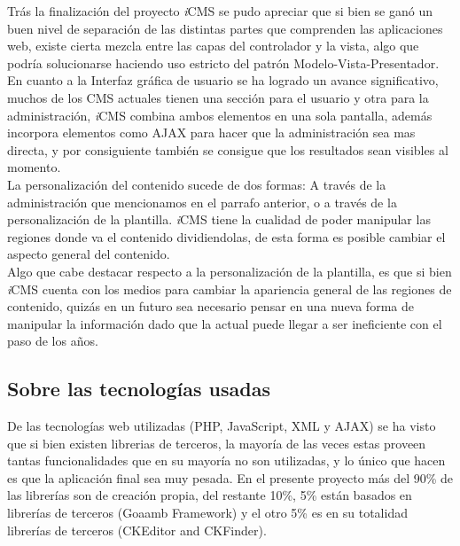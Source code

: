 Tr\'as la finalizaci\'on del proyecto \textit{i}CMS se pudo apreciar que si bien se gan\'o un buen nivel de separaci\'on de las distintas partes que comprenden las aplicaciones web, existe cierta mezcla entre las capas del controlador y la vista, algo que podr\'ia solucionarse haciendo uso estricto del patr\'on Modelo-Vista-Presentador.\\

En cuanto a la Interfaz gr\'afica de usuario se ha logrado un avance significativo, muchos de los CMS actuales tienen una secci\'on para el usuario y otra para la administraci\'on, \textit{i}CMS combina ambos elementos en una sola pantalla, adem\'as incorpora elementos como AJAX para hacer que la administraci\'on sea mas directa, y por consiguiente tambi\'en se consigue que los resultados sean visibles al momento.\\

La personalizaci\'on del contenido sucede de dos formas: A trav\'es de la administraci\'on que mencionamos en el parrafo anterior, o a trav\'es de la personalizaci\'on de la plantilla. \textit{i}CMS tiene la cualidad de poder manipular las regiones donde va el contenido dividiendolas, de esta forma es posible cambiar el aspecto general del contenido.\\

Algo que cabe destacar respecto a la personalizaci\'on de la plantilla, es que si bien \textit{i}CMS cuenta con los medios para cambiar la apariencia general de las regiones de contenido, quiz\'as en un futuro sea necesario pensar en una nueva forma de manipular la informaci\'on dado que la actual puede llegar a ser ineficiente con el paso de los a\~nos.\\

\subsection{Sobre las tecnolog\'ias usadas}
De las tecnolog\'ias web utilizadas (PHP, JavaScript, XML y AJAX) se ha visto que si bien existen librerias de terceros, la mayor\'ia de las veces estas proveen tantas funcionalidades que en su mayor\'ia no son utilizadas, y lo \'unico que hacen es que la aplicaci\'on final sea muy pesada. En el presente proyecto m\'as del 90\% de las librer\'ias son de creaci\'on propia, del restante 10\%, 5\% est\'an basados en librer\'ias de terceros (Goaamb Framework) y el otro 5\% es en su totalidad librer\'ias de terceros (CKEditor and CKFinder).\\

